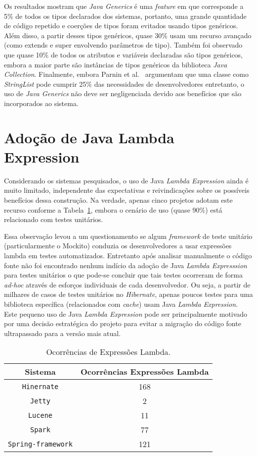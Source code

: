 Os resultados mostram que \textit{Java Generics} é uma \textit{feature} em que corresponde a 5\% de todos os tipos declarados dos sistemas, portanto, uma grande quantidade de código repetido e coerções de tipos foram evitados usando tipos genéricos. Além disso, a partir desses tipos genéricos, quase 30\% usam um recurso avançado (como extends e super envolvendo parâmetros de tipo). Também foi observado que quase 10\% de todos os atributos e variáveis declaradas são tipos genéricos, embora a maior parte são instâncias de tipos genéricos da biblioteca \textit{Java Collection}. Finalmente, embora Parnin et al.~\cite{Parnin:ACM2011} argumentam que uma classe como \textit{StringList} pode cumprir 25\% das necessidades de desenvolvedores entretanto, o uso de \textit{Java Generics} não deve ser negligenciada devido aos benefícios que são incorporados ao sistema.



\section{Adoção de Java Lambda Expression}
Considerando os sistemas pesquisados, o uso de Java \textit{Lambda Expression} ainda é muito limitado, independente das expectativas e reivindicações sobre os possíveis benefícios dessa construção. Na verdade, apenas cinco projetos adotam este recurso conforme a Tabela~\ref{tab:adocaoLambda}, embora o cenário de uso (quase 90\%) está relacionado com testes unitários. 

Essa observa\c c\~{a}o levou a um questionamento se algum 
\textit{framework} de teste unitário (particularmente o 
Mockito) conduzia os desenvolvedores 
a usar express\~{o}es lambda em testes automatizados. 
Entretanto após analisar manualmente o código fonte não foi encontrado nenhum indício da adoção de Java\textit{ Lambda Expresssion} para testes unitários o que pode-se concluir que tais testes ocorreram de forma \textit{ad-hoc} através de esforços individuais de cada desenvolvedor.
Ou seja, a partir de milhares de casos de testes unitários no \textit{Hibernate}, apenas poucos testes para uma biblioteca específica (relacionados com \textit{cache}) usam Java\textit{ Lambda Expression}. Este pequeno uso de Java\textit{ Lambda Expression} pode ser principalmente motivado por uma decisão estratégica do projeto para evitar a migração do código fonte ultrapassado para a versão mais atual.

\begin{table}[h]
	\centering
	\caption{Ocorrências de Expressões Lambda.}
	\begin{tabular}{cc}
		\hline
		Sistema & Ocorrências Expressões Lambda\\ 
		\hline \hline
		\texttt{Hinernate} & 168 \\ 
		\texttt{Jetty} & 2 \\ 
		\texttt{Lucene} & 11 \\ 
		\texttt{Spark} & 77 \\ 
		\texttt{Spring-framework} & 121 \\ \hline
	\end{tabular}
	\label{tab:adocaoLambda} %
\end{table}



